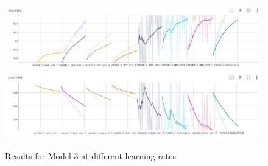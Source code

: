 





\begin{center}
    \begin{figure}[!ht]
        \centering
        \includegraphics[width=\textwidth]{images/exp1_acc3+loss3.jpg}
        \label{fig:exp1_model3}
        \caption{Results for Model 3 at different learning rates}
    \end{figure}
\end{center}



